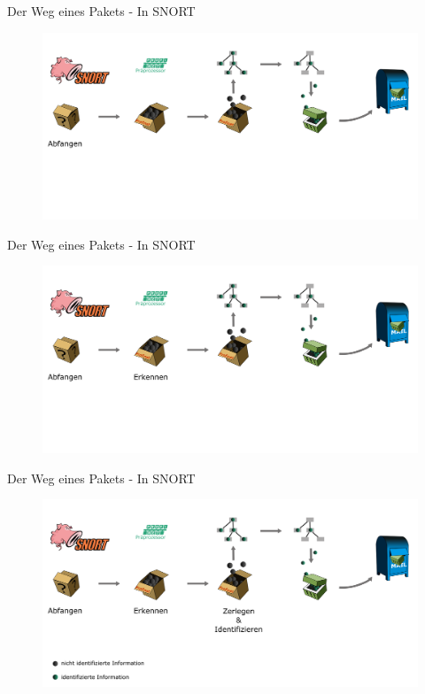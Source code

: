 \begin{frame}{Der Weg eines Pakets - In SNORT}
	\begin{figure}
		\centering
		\includegraphics[width=\textwidth]{./images/path_snort/1.png}
	\end{figure}
\end{frame}

\begin{frame}{Der Weg eines Pakets - In SNORT}
	\begin{figure}
		\centering
		\includegraphics[width=\textwidth]{./images/path_snort/2.png}
	\end{figure}
\end{frame}

\begin{frame}{Der Weg eines Pakets - In SNORT}
	\begin{figure}
		\centering
		\includegraphics[width=\textwidth]{./images/path_snort/3.png}
	\end{figure}
\end{frame}

